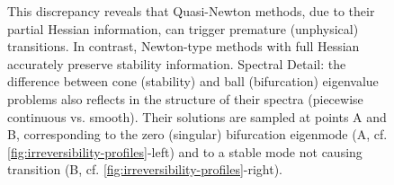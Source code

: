 \begin{figure}[htbp]
{{            This discrepancy reveals that Quasi-Newton methods, due to their partial Hessian information, can trigger premature (unphysical) transitions. In contrast, Newton-type methods with full Hessian accurately preserve stability information.
            Spectral Detail: the difference between cone (stability) and ball (bifurcation) eigenvalue problems also reflects in the structure of their spectra (piecewise continuous vs. smooth). Their solutions are sampled at points A and B, corresponding to the zero (singular) bifurcation eigenmode (A, cf. \ref{fig:irreversibility-profiles}-left) and to a stable mode not causing transition (B, cf. \ref{fig:irreversibility-profiles}-right).}
    }
    \label{fig:shouldnt}
\end{figure}
